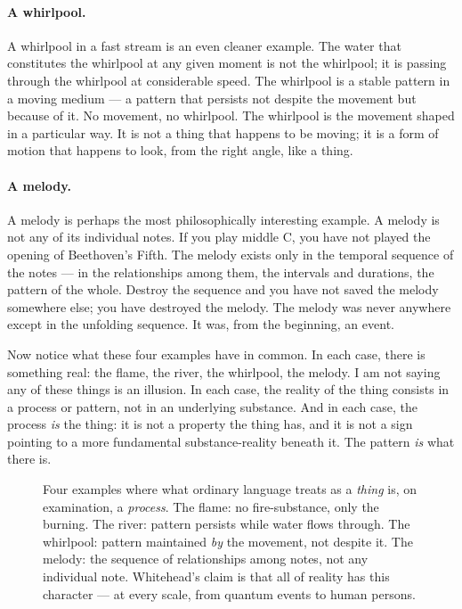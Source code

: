 \paragraph{A whirlpool.}
A whirlpool in a fast stream is an even cleaner example.
The water that constitutes the whirlpool at any given moment is not the
whirlpool; it is passing through the whirlpool at considerable speed.
The whirlpool is a stable pattern in a moving medium --- a pattern that
persists not despite the movement but because of it.
No movement, no whirlpool.
The whirlpool is the movement shaped in a particular way.
It is not a thing that happens to be moving; it is a form of motion that
happens to look, from the right angle, like a thing.

\paragraph{A melody.}
A melody is perhaps the most philosophically interesting example.
A melody is not any of its individual notes.
If you play middle C, you have not played the opening of Beethoven's Fifth.
The melody exists only in the temporal sequence of the notes --- in the
relationships among them, the intervals and durations, the pattern of the
whole.
Destroy the sequence and you have not saved the melody somewhere else;
you have destroyed the melody.
The melody was never anywhere except in the unfolding sequence.
It was, from the beginning, an event.

Now notice what these four examples have in common.
In each case, there is something real: the flame, the river, the whirlpool,
the melody.
I am not saying any of these things is an illusion.
In each case, the reality of the thing consists in a process or pattern,
not in an underlying substance.
And in each case, the process \emph{is} the thing: it is not a property
the thing has, and it is not a sign pointing to a more fundamental
substance-reality beneath it.
The pattern \emph{is} what there is.

\begin{figure}[htbp]
  \centering
  \resizebox{\linewidth}{!}{}
  \caption[Four faces of process: events mistaken for things]{Four examples where what ordinary language treats as a \emph{thing} is, on examination, a \emph{process}. The flame: no fire-substance, only the burning. The river: pattern persists while water flows through. The whirlpool: pattern maintained \emph{by} the movement, not despite it. The melody: the sequence of relationships among notes, not any individual note. Whitehead's claim is that all of reality has this character --- at every scale, from quantum events to human persons.}
  \label{fig:four-examples}
\end{figure}


